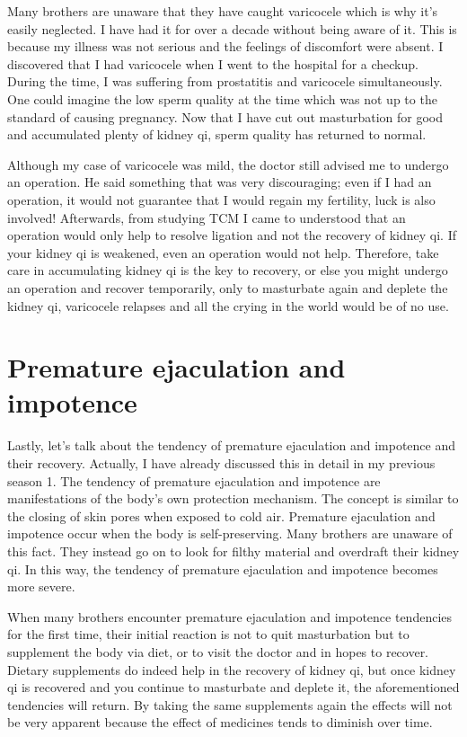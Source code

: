\documentclass[
]{book}
\begin{document}
Many brothers are unaware that they have caught varicocele which is why it's easily neglected. I have had it for over a decade without being aware of it. This is because my illness was not serious and the feelings of discomfort were absent. I discovered that I had varicocele when I went to the hospital for a checkup. During the time, I was suffering from prostatitis and varicocele simultaneously. One could imagine the low sperm quality at the time which was not up to the standard of causing pregnancy. Now that I have cut out masturbation for good and accumulated plenty of kidney qi, sperm quality has returned to normal.

Although my case of varicocele was mild, the doctor still advised me to undergo an operation. He said something that was very discouraging; even if I had an operation, it would not guarantee that I would regain my fertility, luck is also involved! Afterwards, from studying TCM I came to understood that an operation would only help to resolve ligation and not the recovery of kidney qi. If your kidney qi is weakened, even an operation would not help. Therefore, take care in accumulating kidney qi is the key to recovery, or else you might undergo an operation and recover temporarily, only to masturbate again and deplete the kidney qi, varicocele relapses and all the crying in the world would be of no use.

\hypertarget{premature-ejaculation-and-impotence}{%
\section{Premature ejaculation and impotence}\label{premature-ejaculation-and-impotence}}

Lastly, let's talk about the tendency of premature ejaculation and impotence and their recovery. Actually, I have already discussed this in detail in my previous season 1. The tendency of premature ejaculation and impotence are manifestations of the body's own protection mechanism. The concept is similar to the closing of skin pores when exposed to cold air. Premature ejaculation and impotence occur when the body is self-preserving. Many brothers are unaware of this fact. They instead go on to look for filthy material and overdraft their kidney qi. In this way, the tendency of premature ejaculation and impotence becomes more severe.

When many brothers encounter premature ejaculation and impotence tendencies for the first time, their initial reaction is not to quit masturbation but to supplement the body via diet, or to visit the doctor and in hopes to recover. Dietary supplements do indeed help in the recovery of kidney qi, but once kidney qi is recovered and you continue to masturbate and deplete it, the aforementioned tendencies will return. By taking the same supplements again the effects will not be very apparent because the effect of medicines tends to diminish over time.
\end{document}
